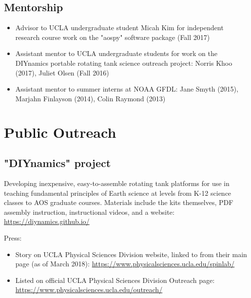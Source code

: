 \documentclass[12pt,letterpaper]{shillcv}
\begin{document}
\subsection*{Mentorship}
\label{sec:orgd287dba}
\begin{itemize}
\item Advisor to UCLA undergraduate student Micah Kim for independent research
course work on the "aospy" software package (Fall 2017)
\item Assistant mentor to UCLA undergraduate students for work on the DIYnamics
portable rotating tank science outreach project: Norris Khoo (2017), Juliet
Olsen (Fall 2016)
\item Assistant mentor to summer interns at NOAA GFDL: Jane Smyth (2015), Marjahn
Finlayson (2014), Colin Raymond (2013)
\end{itemize}
\section*{Public Outreach}
\label{sec:org66714a3}
\subsection*{"DIYnamics" project}
\label{sec:org590e33a}
Developing inexpensive, easy-to-assemble rotating tank platforms for use in
teaching fundamental principles of Earth science at levels from K-12 science
classes to AOS graduate courses.  Materials include the kits themselves, PDF
assembly instruction, instructional videos, and a website:
\url{https://diynamics.github.io/}

Press:

\begin{itemize}
\item Story on UCLA Physical Sciences Division website, linked to from their main
page (as of March 2018): \url{https://www.physicalsciences.ucla.edu/spinlab/}
\item Listed on official UCLA Physical Sciences Division Outreach page:
\url{https://www.physicalsciences.ucla.edu/outreach/}
\end{itemize}
\end{document}
